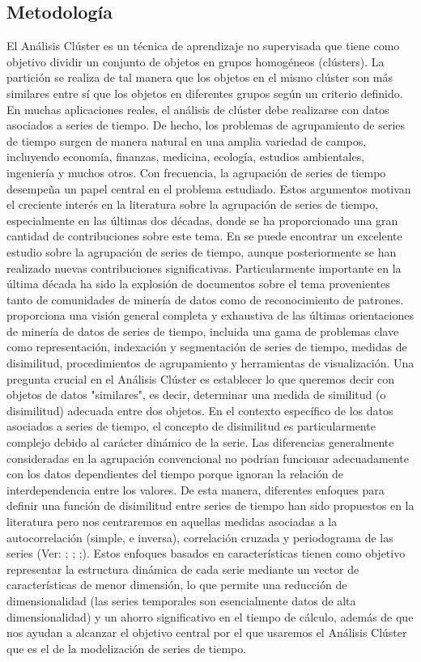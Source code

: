 \documentclass[10pt,a4paper]{article}
\begin{document}
\subsection{Metodología}
El Análisis Clúster es un técnica de aprendizaje no supervisada que tiene como objetivo dividir un conjunto de objetos en grupos homogéneos (clústers). La partición se realiza de tal manera que los objetos en el mismo clúster son más similares entre sí que los objetos en diferentes grupos según un criterio definido. En muchas aplicaciones reales, el análisis de clúster debe realizarse con datos asociados a  series de tiempo. De hecho, los problemas de agrupamiento de series de tiempo surgen de manera natural en una amplia variedad de campos, incluyendo economía, finanzas, medicina, ecología, estudios ambientales, ingeniería y muchos otros. 
Con frecuencia, la agrupación de series de tiempo desempeña un papel central en el problema estudiado. Estos argumentos motivan el creciente interés en la literatura sobre la agrupación de series de tiempo, especialmente en las últimas dos décadas, donde se ha proporcionado una gran cantidad de contribuciones sobre este tema. En \cite{liao2005clustering} se puede encontrar un excelente estudio sobre la agrupación de series de tiempo, aunque posteriormente se han realizado nuevas contribuciones significativas. Particularmente importante en la última década ha sido la explosión de documentos sobre el tema provenientes tanto de comunidades de minería de datos como de reconocimiento de patrones. \cite{fu2011review} proporciona una visión general completa y exhaustiva de las últimas orientaciones de minería de datos de series de tiempo, incluida una gama de problemas clave como representación, indexación y segmentación de series de tiempo, medidas de disimilitud, procedimientos de agrupamiento y herramientas de visualización.
Una pregunta crucial en el Análisis Clúster es establecer lo que queremos decir con objetos de datos "similares", es decir, determinar una medida de similitud (o disimilitud) adecuada entre dos objetos. En el contexto específico de los datos asociados a series de tiempo, el concepto de disimilitud es particularmente complejo debido al carácter dinámico de la serie. Las diferencias generalmente consideradas en la agrupación convencional no podrían funcionar adecuadamente con los datos dependientes del tiempo porque ignoran la relación de interdependencia entre los valores. 
De esta manera, diferentes enfoques para definir una función de disimilitud entre series de tiempo han sido propuestos en la literatura pero nos centraremos en aquellas medidas asociadas a la autocorrelación (simple, e inversa), correlación cruzada y periodograma de las series (Ver: \cite{struzik1999haar}; \cite{galeano2000multivariate}; \cite{caiado2006periodogram};\cite{chouakria2007adaptive}). Estos enfoques basados en características tienen como objetivo representar la estructura dinámica de cada serie mediante un vector de características de menor dimensión, lo que permite una reducción de dimensionalidad (las series temporales son esencialmente datos de alta dimensionalidad) y un ahorro significativo en el tiempo de cálculo, además de que nos ayudan a alcanzar el objetivo central por el que usaremos el Análisis Clúster que es el de la modelización de series de tiempo.
\end{document}
